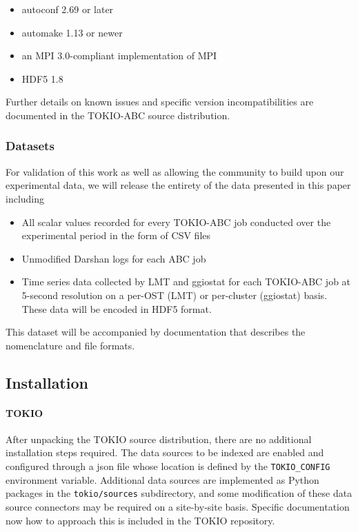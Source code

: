 \begin{itemize}
\item autoconf 2.69 or later
\item automake 1.13 or newer
\item an MPI 3.0-compliant implementation of MPI
\item HDF5 1.8
\end{itemize}

Further details on known issues and specific version incompatibilities are documented in the TOKIO-ABC source distribution.

\subsubsection{Datasets}

For validation of this work as well as allowing the community to build upon our experimental data, we will release the entirety of the data presented in this paper including

\begin{itemize}
\item All scalar values recorded for every TOKIO-ABC job conducted over the experimental period in the form of CSV files
\item Unmodified Darshan logs for each ABC job
\item Time series data collected by LMT and ggiostat for each TOKIO-ABC job at 5-second resolution on a per-OST (LMT) or per-cluster (ggiostat) basis.  These data will be encoded in HDF5 format.
\end{itemize}

This dataset will be accompanied by documentation that describes the nomenclature and file formats.

\subsection{Installation}

\paragraph{TOKIO} After unpacking the TOKIO source distribution, there are no additional installation steps required.
The data sources to be indexed are enabled and configured through a json file whose location is defined by the \texttt{TOKIO\_CONFIG} environment variable.
Additional data sources are implemented as Python packages in the \texttt{tokio/sources} subdirectory, and some modification of these data source connectors may be required on a site-by-site basis.
Specific documentation now how to approach this is included in the TOKIO repository.

